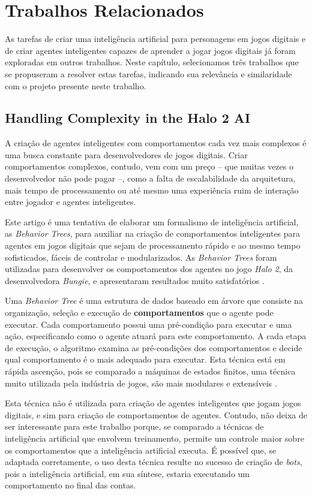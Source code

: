 \chapter{\label{chap:related-work}Trabalhos Relacionados}
As tarefas de criar uma inteligência artificial para personagens em jogos
digitais e de criar agentes inteligentes capazes de aprender a jogar jogos
digitais já foram exploradas em outros trabalhos. Neste capítulo, selecionamos
três trabalhos que se propuseram a resolver estas tarefas, indicando sua
relevância e similaridade com o projeto presente neste trabalho. 


\section{Handling Complexity in the Halo 2 AI}
A criação de agentes inteligentes com comportamentos cada vez mais complexos é
uma busca constante para desenvolvedores de jogos digitais. Criar comportamentos
complexos, contudo, vem com um preço -- que muitas vezes o desenvolvedor não
pode pagar --, como a falta de escalabilidade da arquitetura, mais tempo de
processamento ou até mesmo uma experiência ruim de interação entre jogador e
agentes inteligentes.

Este artigo é uma tentativa de elaborar um formalismo de inteligência
artificial, as \textit{Behavior Trees}, para auxiliar na criação de
comportamentos inteligentes para agentes em jogos digitais que sejam de
processamento rápido e ao mesmo tempo sofisticados, fáceis de controlar e
modularizados. As \textit{Behavior Trees} foram utilizadas para desenvolver os
comportamentos dos agentes no jogo \textit{Halo 2}, da desenvolvedora
\textit{Bungie}, e apresentaram resultados muito satisfatórios \cite{Halo2AI}.

Uma \textit{Behavior Tree} é uma estrutura de dados baseado em árvore que
consiste na organização, seleção e execução de \textbf{comportamentos} que o
agente pode executar. Cada comportamento possui uma pré-condição para executar e
uma ação, especificando como o agente atuará para este comportamento. A cada
etapa de execução, o algoritmo examina as pré-condições dos comportamentos e
decide qual comportamento é o mais adequado para executar. Esta técnica está em
rápida ascenção, pois se comparado a máquinas de estados finitos, uma técnica
muito utilizada pela indústria de jogos, são mais modulares e
extensíveis \cite{Rabin:2015:GAP:2821138}.

Esta técnica não é utilizada para criação de agentes inteligentes que jogam
jogos digitais, e sim para criação de comportamentos de agentes. Contudo, não
deixa de ser interessante para este trabalho porque, se comparado a técnicas de
inteligência artificial que envolvem treinamento, permite um controle maior
sobre os comportamentos que a inteligência artificial executa. É possível que,
se adaptada corretamente, o uso desta técnica resulte no sucesso de criação de
\textit{bots}, pois a inteligência artificial, em sua síntese, estaria
executando um comportamento no final das contas.


